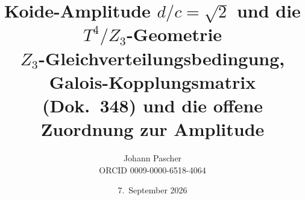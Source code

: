 \documentclass[11pt,a4paper]{report}
\title{Koide-Amplitude $d/c = \sqrt{2}$ und die $T^4/Z_3$-Geometrie\\[0.5em]
  \large $Z_3$-Gleichverteilungsbedingung, Galois-Kopplungsmatrix (Dok.~348)
  und die offene Zuordnung zur Amplitude}
\date{7.~September 2026}
\author{Johann Pascher\\\small ORCID 0009-0000-6518-4064}
\begin{document}
\renewcommand{\thechapter}{}
\renewcommand{\thesection}{\arabic{section}}
\maketitle
\tableofcontents

\end{document}
